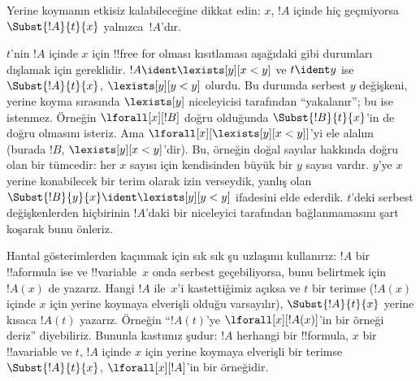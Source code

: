 \documentclass[../../../include/open-logic-section]{subfiles}
\begin{document}
\begin{explain}
Yerine koymanın etkisiz kalabileceğine dikkat edin: $x$, $!A$ içinde
hiç geçmiyorsa $\Subst{!A}{t}{x}$ yalnızca~$!A$'dır.

$t$'nin $!A$ içinde $x$ için !!{free for} olması kısıtlaması aşağıdaki
gibi durumları dışlamak için gereklidir. $!A \ident \lexists[y][x < y]$
ve $t \ident y$ ise $\Subst{!A}{t}{x}$, $\lexists[y][y < y]$ olurdu. Bu
durumda serbest $y$ değişkeni, yerine koyma sırasında $\lexists[y]$
niceleyicisi tarafından ``yakalanır''; bu ise istenmez. Örneğin
$\lforall[x][!B]$ doğru olduğunda $\Subst{!B}{t}{x}$'in de doğru
olmasını isteriz. Ama $\lforall[x][\lexists[y][x < y]]$'yi ele alalım
(burada $!B$, $\lexists[y][x < y]$'dir). Bu, örneğin doğal sayılar
hakkında doğru olan bir tümcedir: her $x$ sayısı için kendisinden büyük
bir $y$ sayısı vardır. $y$'ye $x$ yerine konabilecek bir terim olarak
izin verseydik, yanlış olan $\Subst{!B}{y}{x} \ident \lexists[y][y < y]$
ifadesini elde ederdik. $t$'deki serbest değişkenlerden hiçbirinin
$!A$'daki bir niceleyici tarafından bağlanmamasını şart koşarak bunu
önleriz.
\end{explain}

Hantal gösterimlerden kaçınmak için sık sık şu uzlaşımı kullanırız:
$!A$ bir !!a{formula} ise ve !!{variable}~$x$ onda serbest geçebiliyorsa,
bunu belirtmek için~$!A(x)$ de yazarız. Hangi $!A$ ile~$x$'i
kastettiğimiz açıksa ve $t$ bir terimse ($!A(x)$ içinde $x$ için yerine
koymaya elverişli olduğu varsayılır), $\Subst{!A}{t}{x}$ yerine kısaca
$!A(t)$ yazarız. Örneğin ``$!A(t)$'ye $\lforall[x][!A(x)]$'in bir
örneği deriz'' diyebiliriz. Bununla kastımız şudur: $!A$ herhangi bir
!!{formula}, $x$ bir !!a{variable} ve $t$, $!A$ içinde $x$ için yerine
koymaya elverişli bir terimse $\Subst{!A}{t}{x}$,
$\lforall[x][!A]$'in bir örneğidir.
\end{document}
